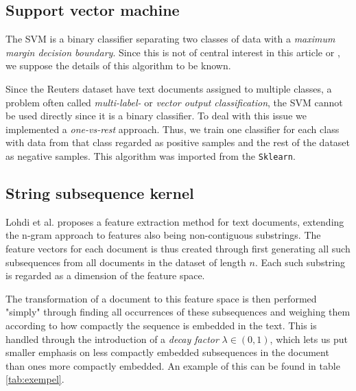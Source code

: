 
\subsection{Support vector machine}
The SVM is a binary classifier separating two classes of data with a \textit{maximum margin decision boundary}. Since this is not of central interest in this article or \cite{lodhi}, we suppose the details of this algorithm to be known. %

Since the Reuters dataset have text documents assigned to multiple classes, a problem often called\textit{ multi-label-} or \textit{vector output classification}, the SVM cannot be used directly since it is a binary classifier. To deal with this issue we implemented a \textit{one-vs-rest} approach. Thus, we train one classifier for each class with data from that class regarded as positive samples and the rest of the dataset as negative samples. This algorithm was imported from the \texttt{Sklearn}. 

\subsection{String subsequence kernel}
Lohdi et al. proposes a feature extraction method for text documents, extending the n-gram approach to features also being non-contiguous substrings. The feature vectors for each document is thus created through first generating all such subsequences from all documents in the dataset of length $ n $. Each such substring is regarded as a dimension of the feature space. 

The transformation of a document to this feature space is then performed "simply" through finding all occurrences of these subsequences and weighing them according to how compactly the sequence is embedded in the text. This is handled through the introduction of a \textit{decay factor} $ \lambda \in (0,1) $, which lets us put smaller emphasis on less compactly embedded subsequences in the document than ones more compactly embedded. An example of this can be found in table \ref{tab:exempel}. %


